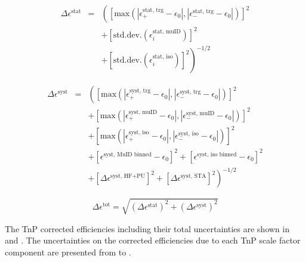 \begin{eqnarray}
    \Delta\epsilon^\text{stat} & = & \left( \left[\text{max} (|\epsilon^\text{stat, trg}_{+} - \epsilon_0|, |\epsilon^\text{stat, trg}_{-} - \epsilon_0|)\right]^2\right. \nonumber\\
     &&+ \left[ \text{std.dev.} \left( \epsilon^\text{stat, muID}_i \right) \right]^2 \nonumber\\
     &&+ \left.\left[ \text{std.dev.} \left( \epsilon^\text{stat, iso}_i \right) \right]^2 \right)^{-1/2} \label{eq:uncert_stat}
\end{eqnarray}
   
\begin{eqnarray}
    \Delta\epsilon^\text{syst}  & = &  \left(\left[\text{max} (|\epsilon^\text{syst, trg}_{+} - \epsilon_0|, |\epsilon^\text{syst, trg}_{-} - \epsilon_0|)\right]^2\right.\nonumber\\
    &&+ \left[\text{max} (|\epsilon^\text{syst, muID}_{+} - \epsilon_0|, |\epsilon^\text{syst, muID}_{-} - \epsilon_0|)\right]^2\nonumber\\
    &&+ \left[\text{max} (|\epsilon^\text{syst, iso}_{+} - \epsilon_0|, |\epsilon^\text{syst, iso}_{-} - \epsilon_0|)\right]^2\nonumber\\
    &&+ \left[\epsilon^\text{syst, MuID binned} - \epsilon_0\right]^2 + \left[\epsilon^\text{syst, iso binned} - \epsilon_0\right]^2\nonumber\\
    &&+ \left.\left[\Delta\epsilon^\text{syst, HF+PU}\right]^2 + \left[\Delta\epsilon^\text{syst, STA}\right]^2\right)^{-1/2} \label{eq:uncert_syst}
\end{eqnarray}

\begin{equation}
    \Delta\epsilon^\text{tot}  =  \sqrt{ (\Delta\epsilon^\text{stat})^2 + (\Delta\epsilon^\text{syst})^2 } \label{eq:uncert_tot}
\end{equation}

The TnP corrected efficiencies including their total uncertainties are shown in  and . The uncertainties on the corrected efficiencies due to each TnP scale factor component are presented from  to .

